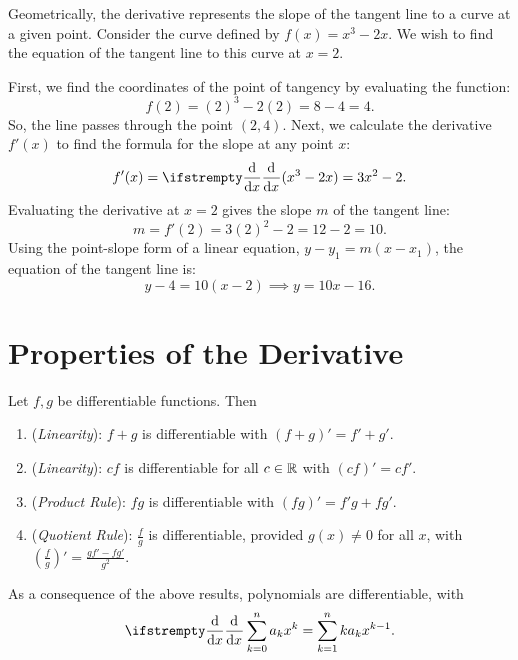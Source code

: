 \documentclass[../calculus.tex]{subfiles}
\begin{document}
\begin{example}
    Geometrically, the derivative represents the slope of the tangent line to a curve at a given point. Consider the curve defined by $f(x) = x^3 - 2x$. We wish to find the equation of the tangent line to this curve at $x = 2$.
    
    First, we find the coordinates of the point of tangency by evaluating the function: 
    \[
      f(2) = (2)^3 - 2(2) = 8 - 4 = 4.
    \]
    So, the line passes through the point $(2, 4)$. Next, we calculate the derivative $f'(x)$ to find the formula for the slope at any point $x$:
    \[
      f'(x) = \deriv{}{x}(x^3 - 2x) = 3x^2 - 2.
    \]
    Evaluating the derivative at $x = 2$ gives the slope $m$ of the tangent line:
    \[
      m = f'(2) = 3(2)^2 - 2 = 12 - 2 = 10.
    \]
    Using the point-slope form of a linear equation, $y - y_1 = m(x - x_1)$, the equation of the tangent line is:
    \[
      y - 4 = 10(x - 2) \implies y = 10x - 16.
    \]
\end{example}

\section{Properties of the Derivative}

\begin{proposition}
  \begin{shaded*}
    Let $f,g$ be differentiable functions. Then
    \begin{enumerate}
      \item (\textit{Linearity}): $f+g$ is differentiable with $(f+g)'=f'+g'$.
      \item (\textit{Linearity}): $cf$ is differentiable for all $c\in\mathbb{R}$ with $(cf)'=cf'$.
      \item (\textit{Product Rule}): $fg$ is differentiable with $(fg)'=f'g+fg'$.
      \item (\textit{Quotient Rule}): $\frac{f}{g}$ is differentiable, provided $g(x)\ne 0$ for all $x$, with $\left(\frac{f}{g}\right)'=\frac{gf'-fg'}{g^2}.$
    \end{enumerate}
  \end{shaded*}
\end{proposition}
\begin{example}
  As a consequence of the above results, polynomials are differentiable, with \[\deriv{}{x}\sum_{k=0}^na_kx^k=\sum_{k=1}^n ka_kx^{k-1}.\]
\end{example}
\end{document}
